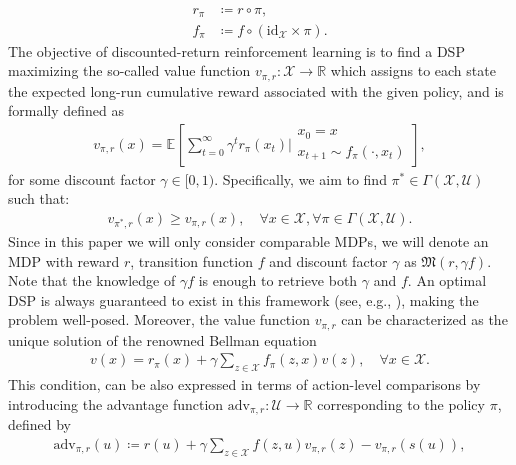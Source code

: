 \documentclass[10pt,leqno]{amsart}
\newcommand{\sml}{\scriptscriptstyle}
\newcommand{\id}[1]{\text{id}_{\sml #1}}
\newcommand{\R}{\mathbb{R}}
\newcommand{\U}{\mathcal{U}}
\newcommand{\X}{\mathcal{X}}
\newcommand{\cost}{r}
\newcommand{\costfb}[1]{\cost_{#1}}
\newcommand{\vv}{v_{\policy, \cost}}
\newcommand{\vvarg}[1]{v_{#1}}
\newcommand{\f}{f}
\newcommand{\ffb}[1]{\f_{#1}}
\newcommand{\policy}{\pi}
\newcommand{\Sect}{\Gamma(\X, \U)}
\newcommand{\state}{x} %
\newcommand{\act}{u}   %
\newcommand{\disc}{\gamma}
\newcommand{\proj}{s}
\newcommand{\advsym}{\text{adv}}
\newcommand{\adv}[2]{\advsym_{#1, #2}}
\newcommand{\mdp}{\mathfrak{M}}
\newcommand{\mdparg}[2]{\mdp\left(#1, #2\right)}
\newcommand{\E}[2]{\mathbb{E}_{#1}\left[#2\right]}
\begin{document}
\begin{subequations}\label{eq:pullback_functions}
    \begin{align}
        \costfb{\policy} &\coloneqq \cost \circ \policy,\\
        \ffb{\policy} &\coloneqq \f \circ (\id{\X} \times \policy).
    \end{align}
\end{subequations}
The objective of discounted-return reinforcement learning is to find a DSP maximizing the so-called value function $\vv : \X \to \R$ which assigns to each state the expected long-run cumulative reward associated with the given policy, and is formally defined as
\begin{align}\label{eq:value_funct_def}
    \vv(\state) = \E{}{\sum_{t = 0}^{\infty} \disc^t \costfb{\policy}(\state_t) \biggr\rvert 
    \begin{array}{l}
      \state_0 = \state\\
      \state_{t + 1} \sim \ffb{\policy}(\cdot, \state_t)
   \end{array}
   },
\end{align}
for some discount factor $\disc \in [0, 1)$. Specifically, we aim to find $\policy^* \in \Sect$ such that:
\begin{align*}
    \vvarg{\policy^*\!,\cost}(\state) \geq \vv(\state), \quad \forall \state \in \X, \forall \policy \in \Sect.
\end{align*}
Since in this paper we will only consider comparable MDPs, we will denote an MDP with reward $\cost$, transition function $\f$ and discount factor $\disc$ as $\mdparg{\cost}{\disc \f}$. Note that the knowledge of $\disc \f$ is enough to retrieve both $\disc$ and $\f$. An optimal DSP is always guaranteed to exist in this framework (see, e.g., \cite[Theorem 7.1.9]{puterman2014markov}), making the problem well-posed. Moreover, the value function $\vv$ can be characterized as the unique solution of the renowned Bellman equation
\begin{align}\label{eq:bellman_equation_v}
    v(\state) = \costfb{\policy}(\state) + \disc  \sum_{z \in \X} \ffb{\policy}(z, \state) v(z), \quad \forall\state \in \X.
\end{align}
This condition, can be also expressed in terms of action-level comparisons by introducing the advantage function $\adv{\policy}{\cost} : \U \to \R$ corresponding to the policy $\policy$, defined by
\begin{align*}
    \adv{\policy}{\cost}(\act) \coloneqq \cost(\act) + \disc  \sum_{z \in \X} \f(z, \act) \vv(z) - \vv(\proj(\act)),
\end{align*}
\end{document}
